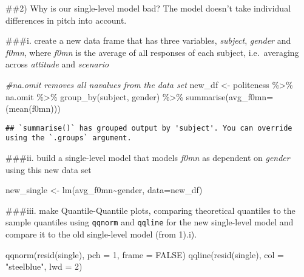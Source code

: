 \documentclass[
]{article}
\newenvironment{Shaded}{\begin{snugshade}}{\end{snugshade}}
\newcommand{\AttributeTok}[1]{\textcolor[rgb]{0.77,0.63,0.00}{#1}}
\newcommand{\CommentTok}[1]{\textcolor[rgb]{0.56,0.35,0.01}{\textit{#1}}}
\newcommand{\ConstantTok}[1]{\textcolor[rgb]{0.00,0.00,0.00}{#1}}
\newcommand{\DecValTok}[1]{\textcolor[rgb]{0.00,0.00,0.81}{#1}}
\newcommand{\FunctionTok}[1]{\textcolor[rgb]{0.00,0.00,0.00}{#1}}
\newcommand{\NormalTok}[1]{#1}
\newcommand{\OtherTok}[1]{\textcolor[rgb]{0.56,0.35,0.01}{#1}}
\newcommand{\SpecialCharTok}[1]{\textcolor[rgb]{0.00,0.00,0.00}{#1}}
\newcommand{\StringTok}[1]{\textcolor[rgb]{0.31,0.60,0.02}{#1}}
\begin{document}
\#\#2) Why is our single-level model bad? The model doesn't take
individual differences in pitch into account.

\#\#\#i. create a new data frame that has three variables,
\emph{subject}, \emph{gender} and \emph{f0mn}, where \emph{f0mn} is the
average of all responses of each subject, i.e.~averaging across
\emph{attitude} and \emph{scenario}

\begin{Shaded}
\begin{Highlighting}[]
\CommentTok{\#na.omit removes all na\textquotesingle{}values\textquotesingle{} from the data set }
\NormalTok{new\_df }\OtherTok{\textless{}{-}}\NormalTok{ politeness }\SpecialCharTok{\%\textgreater{}\%} 
\NormalTok{  na.omit }\SpecialCharTok{\%\textgreater{}\%} 
  \FunctionTok{group\_by}\NormalTok{(subject, gender) }\SpecialCharTok{\%\textgreater{}\%} 
  \FunctionTok{summarise}\NormalTok{(}\AttributeTok{avg\_f0mn=}\NormalTok{(}\FunctionTok{mean}\NormalTok{(f0mn)))}
\end{Highlighting}
\end{Shaded}

\begin{verbatim}
## `summarise()` has grouped output by 'subject'. You can override using the `.groups` argument.
\end{verbatim}

\#\#\#ii. build a single-level model that models \emph{f0mn} as
dependent on \emph{gender} using this new data set

\begin{Shaded}
\begin{Highlighting}[]
\NormalTok{new\_single }\OtherTok{\textless{}{-}} \FunctionTok{lm}\NormalTok{(avg\_f0mn}\SpecialCharTok{\textasciitilde{}}\NormalTok{gender, }\AttributeTok{data=}\NormalTok{new\_df)}
\end{Highlighting}
\end{Shaded}

\#\#\#iii. make Quantile-Quantile plots, comparing theoretical quantiles
to the sample quantiles using \texttt{qqnorm} and \texttt{qqline} for
the new single-level model and compare it to the old single-level model
(from 1).i).

\begin{Shaded}
\begin{Highlighting}[]
\FunctionTok{qqnorm}\NormalTok{(}\FunctionTok{resid}\NormalTok{(single), }\AttributeTok{pch =} \DecValTok{1}\NormalTok{, }\AttributeTok{frame =} \ConstantTok{FALSE}\NormalTok{)}
\FunctionTok{qqline}\NormalTok{(}\FunctionTok{resid}\NormalTok{(single), }\AttributeTok{col =} \StringTok{"steelblue"}\NormalTok{, }\AttributeTok{lwd =} \DecValTok{2}\NormalTok{)}
\end{Highlighting}
\end{Shaded}
\end{document}
